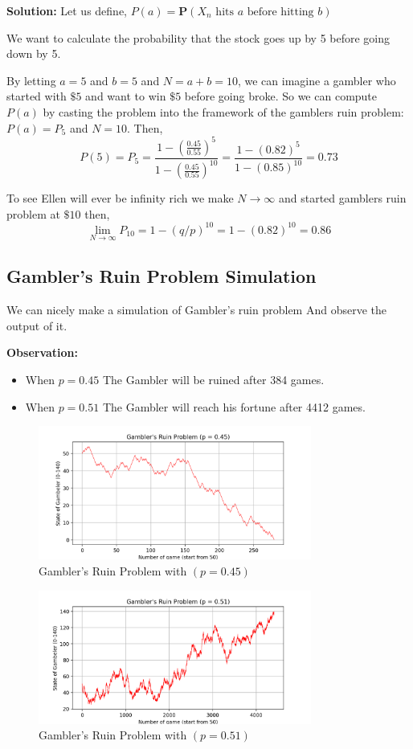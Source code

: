 \textbf{Solution: } Let us define,
$ P(a) = \mathbf{P}\left(X_{n} \text{ hits }a \text{ before hitting } b\right)$ 

We want to calculate the probability that the stock goes up by 5 before going down by 5.

By letting $ a=5 $ and $ b=5 $ and $ N=a+b=10 $, we can imagine a gambler who started with $ \$5 $ and want to win $ \$5 $
before going broke. So we can compute $P(a)$ by casting the problem into the framework of the gamblers ruin problem: 
$ P(a) = P_{5} $ and $ N=10 $. Then,
\[
    P(5) = P_{5} = \frac{1-\left(\frac{0.45}{0.55}\right)^{5}}{1-\left(\frac{0.45}{0.55}\right)^{10}} = \frac{1-(0.82)^{5}}{1-(0.85)^{10}} = 0.73
\]

To see Ellen will ever be infinity rich we make  $ N\to\infty $ and started gamblers ruin problem at $ \$10 $ then,
\[
    \lim_{N\to\infty}P_{10} = 1 - (q/p)^{10} = 1 - (0.82)^{10} = 0.86
\]


\subsection{Gambler's Ruin Problem Simulation}
We can nicely make a simulation of Gambler's ruin problem And observe the output of it.

\textbf{Observation: }
\begin{itemize}
    \item When $ p=0.45 $ The Gambler will be ruined after 384 games.
    \item When $ p=0.51 $ The Gambler will reach his fortune after 4412 games.
\end{itemize}


\begin{figure}[H]
    \centering
    \includegraphics[width=0.8\textwidth]{pic/GR0.45.png}
    \caption{Gambler's Ruin Problem with $( p=0.45 )$}
\end{figure}

\makeatletter
\setlength{\@fptop}{0pt}
\makeatother

\begin{figure}[H]
    \centering
    \includegraphics[width=0.8\textwidth]{pic/GR0.51.png}
    \caption{Gambler's Ruin Problem with $( p=0.51 )$}
\end{figure}

